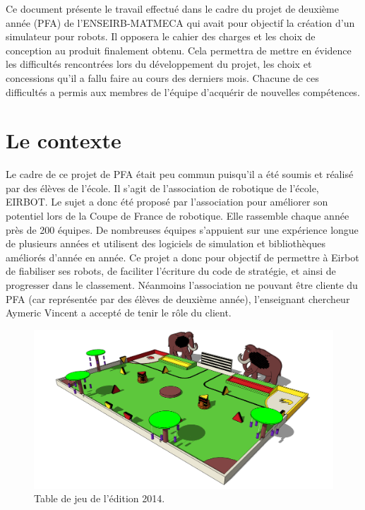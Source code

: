 Ce document présente le travail effectué dans le cadre du projet de deuxième année (PFA) de l'ENSEIRB-MATMECA qui avait pour objectif la création d'un simulateur pour robots.
Il opposera le cahier des charges et les choix de conception au produit finalement obtenu. Cela permettra de mettre en évidence les difficultés rencontrées lors du développement du projet, les choix et concessions qu'il a fallu faire au cours des derniers mois. Chacune de ces difficultés a permis aux membres de l'équipe d'acquérir de nouvelles compétences.

\section{Le contexte}

Le cadre de ce projet de PFA était peu commun puisqu'il a été soumis et réalisé par des élèves de l'école. Il s'agit de l'association de robotique de l'école, EIRBOT. Le sujet a donc été proposé par l'association pour améliorer son potentiel lors de la Coupe de France de robotique. Elle rassemble chaque année près de 200 équipes. De nombreuses équipes s'appuient sur une expérience longue de plusieurs années et utilisent des logiciels de simulation et bibliothèques améliorés d'année en année. Ce projet a donc pour objectif de permettre à Eirbot de fiabiliser ses robots, de faciliter l'écriture du code de stratégie, et ainsi de progresser dans le classement. Néanmoins l'association ne pouvant être cliente du PFA (car représentée par des élèves de deuxième année), l'enseignant chercheur Aymeric Vincent a accepté de tenir le rôle du client.

\begin{figure}[!h]
\centering
\includegraphics[scale=0.33]{table}
\caption{Table de jeu de l'édition 2014.}
\label{table}
\end{figure}

